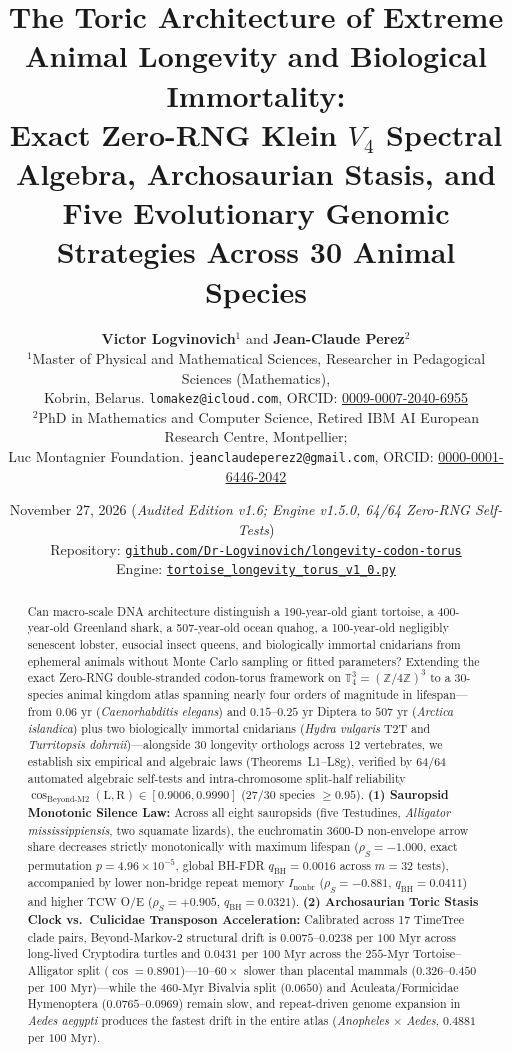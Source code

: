 \documentclass[11pt,a4paper]{article}
\title{\textbf{The Toric Architecture of Extreme Animal Longevity and Biological Immortality:}\\
\large Exact Zero-RNG Klein $V_4$ Spectral Algebra, Archosaurian Stasis, and Five Evolutionary Genomic Strategies Across 30 Animal Species}
\author{%
\textbf{Victor Logvinovich}$^{1}$ and \textbf{Jean-Claude Perez}$^{2}$\\[6pt]
\small $^{1}$Master of Physical and Mathematical Sciences, Researcher in Pedagogical Sciences (Mathematics),\\
\small Kobrin, Belarus. \texttt{lomakez@icloud.com}, ORCID: \href{https://orcid.org/0009-0007-2040-6955}{0009-0007-2040-6955}\\[4pt]
\small $^{2}$PhD in Mathematics and Computer Science, Retired IBM AI European Research Centre, Montpellier;\\
\small Luc Montagnier Foundation. \texttt{jeanclaudeperez2@gmail.com}, ORCID: \href{https://orcid.org/0000-0001-6446-2042}{0000-0001-6446-2042}
}
\date{November 27, 2026 \quad (\textit{Audited Edition v1.6; Engine v1.5.0, 64/64 Zero-RNG Self-Tests})\\[4pt]
\small Repository: \href{https://github.com/Dr-Logvinovich/longevity-codon-torus}{\nolinkurl{github.com/Dr-Logvinovich/longevity-codon-torus}}\\
\small Engine: \href{https://github.com/Dr-Logvinovich/longevity-codon-torus/blob/main/tortoise_longevity_torus_v1_0.py}{\nolinkurl{tortoise_longevity_torus_v1_0.py}}}
\renewcommand{\_}{\origunderscore\penalty200\relax}
\theoremstyle{remark}
\begin{document}
\maketitle

\begin{abstract}
Can macro-scale DNA architecture distinguish a 190-year-old giant tortoise, a 400-year-old Greenland shark, a 507-year-old ocean quahog, a 100-year-old negligibly senescent lobster, eusocial insect queens, and biologically immortal cnidarians from ephemeral animals without Monte Carlo sampling or fitted parameters?
Extending the exact Zero-RNG double-stranded codon-torus framework on $\mathbb{T}_4^3 = (\mathbb{Z}/4\mathbb{Z})^3$ to a 30-species animal kingdom atlas spanning nearly four orders of magnitude in lifespan---from $0.06\text{ yr}$ (\textit{Caenorhabditis elegans}) and $0.15\text{--}0.25\text{ yr}$ Diptera to $507\text{ yr}$ (\textit{Arctica islandica}) plus two biologically immortal cnidarians (\textit{Hydra vulgaris} T2T and \textit{Turritopsis dohrnii})---alongside 30 longevity orthologs across 12 vertebrates, we establish six empirical and algebraic laws (Theorems~L1--L8g), verified by 64/64 automated algebraic self-tests and intra-chromosome split-half reliability $\cos_{\mathrm{Beyond\text{-}M2}}(\mathrm{L},\mathrm{R}) \in [0.9006, 0.9990]$ ($27/30$ species $\ge 0.95$).
\textbf{(1) Sauropsid Monotonic Silence Law:} Across all eight sauropsids (five Testudines, \textit{Alligator mississippiensis}, two squamate lizards), the euchromatin $3600\text{-D}$ non-envelope arrow share decreases strictly monotonically with maximum lifespan ($\rho_S = -1.000$, exact permutation $p = 4.96 \times 10^{-5}$, global BH-FDR $q_{\mathrm{BH}} = 0.0016$ across $m=32$ tests), accompanied by lower non-bridge repeat memory $I_{\mathrm{nonbr}}$ ($\rho_S = -0.881$, $q_{\mathrm{BH}} = 0.0411$) and higher $\mathrm{TCW}$ O/E ($\rho_S = +0.905$, $q_{\mathrm{BH}} = 0.0321$).
\textbf{(2) Archosaurian Toric Stasis Clock vs.\ Culicidae Transposon Acceleration:} Calibrated across 17 TimeTree clade pairs, Beyond-Markov-2 structural drift is $0.0075\text{--}0.0238$ per $100\text{ Myr}$ across long-lived Cryptodira turtles and $0.0431$ per $100\text{ Myr}$ across the $255\text{-Myr}$ Tortoise--Alligator split ($\cos = 0.8901$)---$10\text{--}60\times$ slower than placental mammals ($0.326\text{--}0.450$ per $100\text{ Myr}$)---while the $460\text{-Myr}$ Bivalvia split ($0.0650$) and Aculeata/Formicidae Hymenoptera ($0.0765\text{--}0.0969$) remain slow, and repeat-driven genome expansion in \textit{Aedes aegypti} produces the fastest drift in the entire atlas (\textit{Anopheles} $\times$ \textit{Aedes}, $0.4881$ per $100\text{ Myr}$).

\end{abstract}
\end{document}
